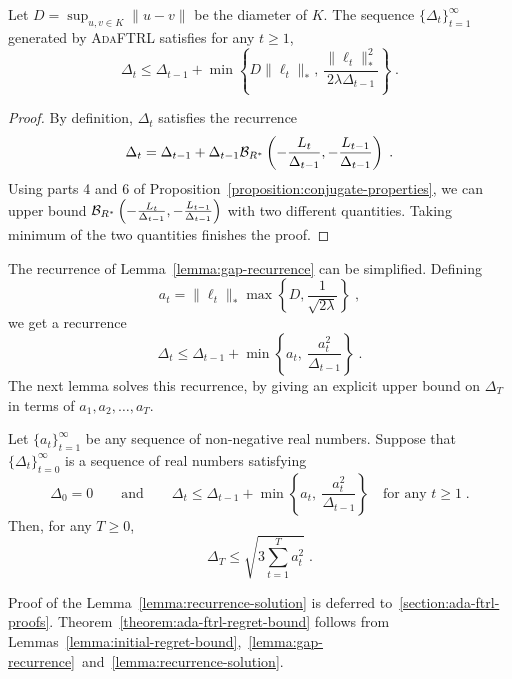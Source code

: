 \begin{lemma}[Recurrence]
\label{lemma:gap-recurrence}
Let $D = \sup_{u, v \in K} \|u -v\|$ be the diameter of $K$.  The sequence
$\{\Delta_t\}_{t=1}^\infty$ generated by \textsc{AdaFTRL} satisfies for any $t
\ge 1$,
$$
\Delta_t \le \Delta_{t-1} + \min \left\{ D\|\ell_t\|_*, \ \frac{\|\ell_t\|_*^2}{2\lambda \Delta_{t-1}} \right\} \; .
$$
\end{lemma}

\begin{proof}
By definition, $\Delta_t$ satisfies the recurrence
$$
\Delta_t = \Delta_{t-1} + \Delta_{t-1} \mathcal{B}_{R^*}\left( - \frac{L_t}{\Delta_{t-1}}, - \frac{L_{t-1}}{\Delta_{t-1}} \right) \; .
$$
Using parts 4 and 6 of Proposition~\ref{proposition:conjugate-properties}, we
can upper bound $\mathcal{B}_{R^*}\left( - \frac{L_t}{\Delta_{t-1}}, -
\frac{L_{t-1}}{\Delta_{t-1}} \right)$ with two different quantities.  Taking
minimum of the two quantities finishes the proof.
\end{proof}

The recurrence of Lemma~\ref{lemma:gap-recurrence} can be simplified. Defining
$$
a_t = \|\ell_t\|_* \max \left\{D, \frac{1}{\sqrt{2 \lambda}} \right\} \; ,
$$
we get a recurrence
$$
\Delta_t \le \Delta_{t-1} + \min \left\{ a_t, \ \frac{a_t^2}{\Delta_{t-1}} \right\} \; .
$$
The next lemma solves this recurrence, by giving an explicit upper bound on
$\Delta_T$ in terms of $a_1, a_2, \dots, a_T$.

\begin{lemma}
\label{lemma:recurrence-solution}
Let $\{a_t\}_{t=1}^\infty$ be any sequence of non-negative real numbers.
Suppose that $\{\Delta_t\}_{t=0}^\infty$ is a sequence of real numbers
satisfying
$$
\Delta_0 = 0 \qquad \text{and} \qquad
\Delta_t \le \Delta_{t-1} + \min \left\{ a_t, \ \frac{a_t^2}{\Delta_{t-1}} \right\} \quad \text{for any $t \ge 1$} \; .
$$
Then, for any $T \ge 0$,
$$
\Delta_T \le \sqrt{3 \sum_{t=1}^T a_t^2} \; .
$$
\end{lemma}
%
Proof of the Lemma~\ref{lemma:recurrence-solution} is deferred
to~\ref{section:ada-ftrl-proofs}.  Theorem~\ref{theorem:ada-ftrl-regret-bound}
follows from
Lemmas~\ref{lemma:initial-regret-bound},~\ref{lemma:gap-recurrence}~and~\ref{lemma:recurrence-solution}.
